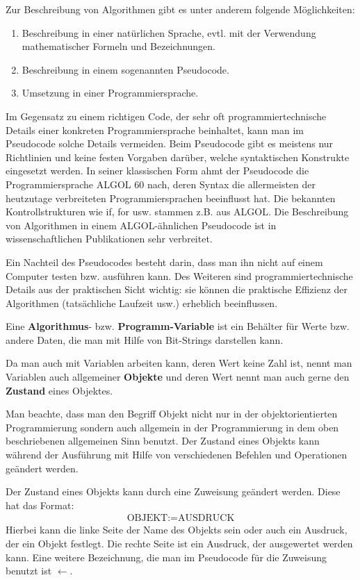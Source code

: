 \begin{bem} 
Zur Beschreibung von Algorithmen
gibt es unter anderem folgende Möglichkeiten: 
\begin{enumerate}
	\item Beschreibung in einer natürlichen Sprache, evtl. mit der Verwendung mathematischer Formeln und Bezeichnungen. 
	\item Beschreibung in einem sogenannten Pseudocode. 
	\item Umsetzung in einer Programmiersprache. 
\end{enumerate} 
Im Gegensatz zu einem richtigen Code, der sehr oft programmiertechnische Details einer konkreten Programmiersprache beinhaltet, kann man im Pseudocode solche Details vermeiden. Beim Pseudocode gibt es meistens nur Richtlinien und keine festen Vorgaben darüber, welche syntaktischen Konstrukte eingesetzt werden. In seiner klassischen Form ahmt der Pseudocode die Programmiersprache ALGOL 60 nach, deren Syntax die allermeisten der heutzutage verbreiteten Programmiersprachen beeinflusst hat. Die bekannten Kontrollstrukturen wie if, for usw.  stammen z.B. aus ALGOL. Die Beschreibung von Algorithmen in einem ALGOL-ähnlichen Pseudocode ist in wissenschaftlichen Publikationen sehr verbreitet. 

Ein Nachteil des Pseudocodes besteht darin, dass man ihn nicht auf einem Computer testen bzw. ausführen kann. Des Weiteren sind programmiertechnische Details aus der praktischen Sicht wichtig: sie können  die praktische Effizienz der Algorithmen (tatsächliche Laufzeit usw.) erheblich beeinflussen. 
\end{bem} 

\begin{defn} 
Eine \textbf{Algorithmus}- bzw. \textbf{Programm-Variable} ist ein Behälter für Werte bzw. andere Daten, die man mit Hilfe von Bit-Strings darstellen kann. 

Da man auch mit Variablen arbeiten kann, deren Wert keine Zahl ist, nennt man Variablen auch allgemeiner \textbf{Objekte} und deren Wert nennt man auch gerne den \textbf{Zustand} eines Objektes. 

Man beachte, dass man den Begriff Objekt nicht nur in der objektorientierten Programmierung sondern auch allgemein in der Programmierung in dem oben beschriebenen allgemeinen Sinn benutzt. Der Zustand eines Objekts kann während der Ausführung mit Hilfe von verschiedenen Befehlen und Operationen geändert werden. 

Der Zustand eines Objekts kann durch eine Zuweisung geändert werden. Diese hat das Format:
\begin{align*}
	\text{OBJEKT} := \text{AUSDRUCK} 
\end{align*} 
Hierbei kann die linke Seite der Name des Objekts sein oder auch ein Ausdruck, der ein Objekt festlegt. Die rechte Seite ist ein Ausdruck, der ausgewertet werden kann. Eine weitere Bezeichnung, die man im Pseudocode für die Zuweisung benutzt ist $\leftarrow$. 
\end{defn} 



